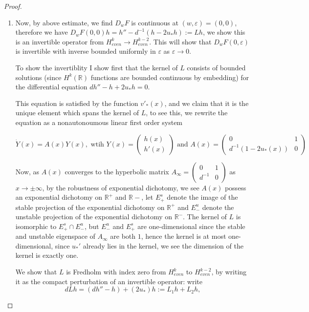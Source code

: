 \documentclass[letterpaper,11pt]{article}
\newcommand{\R}{\mathbb{R}}
\newcommand{\eps}{\varepsilon}
\numberwithin{equation}{section}
\theoremstyle{plain}
\begin{document}
\begin{proof}
\begin{enumerate}
\item  Now, by above estimate, we find $D_wF$ is continuous at $(w,\eps) = (0,0)$, therefore we have $D_wF(0,0) h = h''-d^{-1}(h-2u_* h) := L h$, we show this is an invertible operator from $H^k_{even} \to H^{k-2}_{even}$. This will show that $D_wF(0,\eps)$ is invertible with inverse bounded uniformly in $\eps$ as $\eps \to 0$.

To show the invertiblity I show first that the kernel of $L$ consists of bounded solutions (since $H^k(\R)$ functions are bounded continuous by embedding) for the differential equation $dh'' - h +2u_* h = 0$.

This equation is satisfied by the function $v'_*(x)$, and we claim that it is the unique element which spans the kernel of $L$, to see this, we rewrite the equation as a nonautonoumous linear first order system 

\[
\dot{Y}(x) = A(x)Y(x), \text{ wtih }Y(x) = \begin{pmatrix}
h(x)\\
h'(x)
\end{pmatrix} \text{ and } A(x) = \begin{pmatrix}
0&1\\
d^{-1}(1-2u_*(x))&0
\end{pmatrix}
\]

Now, as $A(x)$ converges to the hyperbolic matrix $A_{\infty}=\begin{pmatrix}
0&1\\
d^{-1}&0
\end{pmatrix}$ as $x \to \pm \infty$, by the robustness of exponential dichotomy, we see $A(x)$ possess an exponential dichotomy on $\R^+$ and $\R-$, let $E_+^s$ denote the image of the stable projection of the exponential dichotomy on $\R^+$ and $E_-^u$ denote the unstable projection of the exponential dichotomy on $\R^-$. The kernel of $L$ is isomorphic to $E_+^s \cap E_-^u$, but $E_-^u$ and $E_+^s$ are one-dimensional since the stable and unstable eigenspace of $A_{\infty}$ are both $1$, hence the kernel is at most one-dimensional, since $u_*'$ already lies in the kernel, we see the dimension of the kernel is exactly one.

We show that $L$ is Fredholm with index zero from $H^k_{even}$ to $H^{k-2}_{even}$, by writing it as the compact perturbation of an invertible operator:  write
\[
dL h = (dh''-h) + (2u_*)h := L_1h+L_2 h,
\] 


\end{enumerate}
\end{proof}
\end{document}
